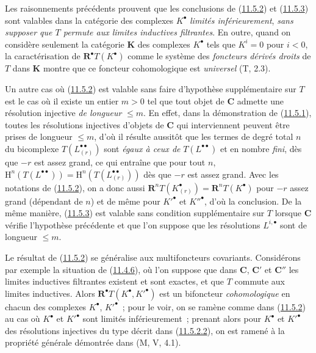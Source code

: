 \begin{remark}[11.5.4]
\label{0.11.5.4-fr}
Les raisonnements précédents prouvent que les conclusions de
(\hyperref[0.11.5.2-fr]{11.5.2}) et
(\hyperref[0.11.5.3-fr]{11.5.3}) sont valables dans la catégorie des
complexes $K^\bullet$ \emph{limités inférieurement}, \emph{sans supposer que $T$
permute aux limites inductives filtrantes}. En outre, quand on considère
seulement la catégorie $\boldsymbol{K}$ des complexes $K^\bullet$ tels que
$K^i=0$ pour $i<0$, la caractérisation de $\mathbf R^\bullet T(K^\bullet)$
comme le système des \emph{foncteurs dérivés droits} de $T$ dans $\boldsymbol{K}$
montre que ce foncteur cohomologique est \emph{universel} (T, 2.3).

Un autre cas où (\hyperref[0.11.5.2-fr]{11.5.2}) est valable sans faire
d'hypothèse supplémentaire sur $T$ est le cas où il existe un entier $m>0$
tel que tout objet de $\boldsymbol{C}$ admette une résolution injective \emph{de longueur}
$\leq m$. En effet, dans la démonstration de
(\hyperref[0.11.5.1-fr]{11.5.1}), toutes les résolutions injectives d'objets
de $\boldsymbol{C}$ qui interviennent peuvent être prises de longueur $\leq m$,
d'où il résulte aussitôt que les termes de degré total $n$ du bicomplexe
$T(L_{(r)}^{\bullet\bullet})$ sont \emph{égaux à ceux de}
$T(L^{\bullet\bullet})$ et en nombre \emph{fini}, dès que $-r$ est assez grand, ce qui
entraîne que pour tout $n$,
$\mathrm H^n(T(L^{\bullet\bullet}))=
\mathrm H^n(T(L_{(r)}^{\bullet\bullet}))$ dès que $-r$ est assez grand. Avec
les notations de (\hyperref[0.11.5.2-fr]{11.5.2}), on a donc aussi
$\mathbf R^nT(K_{(r)}^\bullet)=\mathbf R^nT(K^\bullet)$ pour $-r$ assez grand
(dépendant de $n$) et de même pour $K'^\bullet$ et $K''^\bullet$, d'où la
conclusion. De la même manière, (\hyperref[0.11.5.3-fr]{11.5.3}) est valable
sans condition supplémentaire sur $T$ lorsque $\boldsymbol{C}$ vérifie
l'hypothèse précédente et que l'on suppose que les résolutions
$L^{i,\bullet}$ sont de longueur $\leq m$.
\end{remark}

\begin{env}[11.5.5]
\label{0.11.5.5-fr}
Le résultat de (\hyperref[0.11.5.2-fr]{11.5.2}) se généralise aux
multifoncteurs covariants. Considérons par exemple la situation de
(\hyperref[0.11.4.6-fr]{11.4.6}), où l'on suppose que dans $\boldsymbol{C}$,
$\boldsymbol{C}'$ et $\boldsymbol{C}''$
les limites inductives filtrantes existent et sont exactes, et que $T$ commute
aux limites inductives. Alors $\mathbf R^\bullet T(K^\bullet,K'^\bullet)$ est
un bifoncteur \emph{cohomologique} en chacun des complexes $K^\bullet$,
$K'^\bullet$~; pour le voir, on se ramène comme dans
(\hyperref[0.11.5.2-fr]{11.5.2}) au cas où $K^\bullet$ et $K'^\bullet$ sont
limités inférieurement~; prenant alors pour $K^\bullet$ et $K'^\bullet$ des
résolutions injectives du type décrit dans
(\hyperref[0.11.5.2.2-fr]{11.5.2.2}), on est ramené à la propriété générale
démontrée dans (M, V, 4.1).
\end{env}

